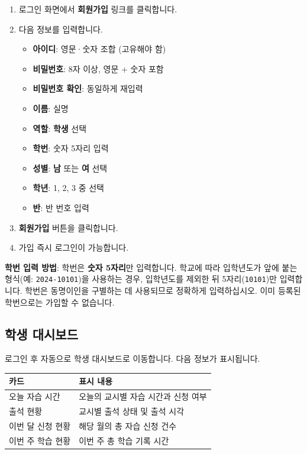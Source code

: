 \documentclass[a4paper,12pt]{article}
\newcommand{\menu}[1]{\textcolor{primary}{\textbf{#1}}}
\begin{document}
\begin{enumerate}[leftmargin=1.5em]
    \item 로그인 화면에서 \menu{회원가입} 링크를 클릭합니다.
    \item 다음 정보를 입력합니다.
    \begin{itemize}
        \item \textbf{아이디}: 영문·숫자 조합 (고유해야 함)
        \item \textbf{비밀번호}: 8자 이상, 영문 + 숫자 포함
        \item \textbf{비밀번호 확인}: 동일하게 재입력
        \item \textbf{이름}: 실명
        \item \textbf{역할}: \menu{학생} 선택
        \item \textbf{학번}: 숫자 5자리 입력
        \item \textbf{성별}: \menu{남} 또는 \menu{여} 선택
        \item \textbf{학년}: 1, 2, 3 중 선택
        \item \textbf{반}: 반 번호 입력
    \end{itemize}
    \item \menu{회원가입} 버튼을 클릭합니다.
    \item 가입 즉시 로그인이 가능합니다.
\end{enumerate}

\begin{notebox}
  \textbf{학번 입력 방법}: 학번은 \textbf{숫자 5자리}만 입력합니다.
  학교에 따라 입학년도가 앞에 붙는 형식(예: \texttt{2024-10101})을 사용하는 경우,
  입학년도를 제외한 뒤 5자리(\texttt{10101})만 입력합니다.
  학번은 동명이인을 구별하는 데 사용되므로 정확하게 입력하십시오.
  이미 등록된 학번으로는 가입할 수 없습니다.
\end{notebox}

\subsection{학생 대시보드}

로그인 후 자동으로 학생 대시보드로 이동합니다. 다음 정보가 표시됩니다.

\begin{center}
\begin{tabular}{ll}
\toprule
\textbf{카드} & \textbf{표시 내용} \\
\midrule
오늘 자습 시간 & 오늘의 교시별 자습 시간과 신청 여부 \\
출석 현황 & 교시별 출석 상태 및 출석 시각 \\
이번 달 신청 현황 & 해당 월의 총 자습 신청 건수 \\
이번 주 학습 현황 & 이번 주 총 학습 기록 시간 \\
\bottomrule
\end{tabular}
\end{center}
\end{document}
